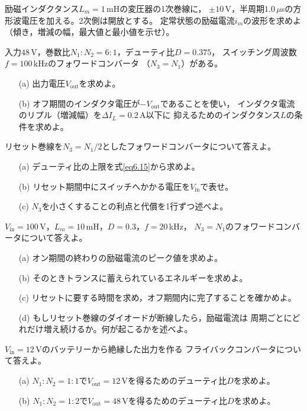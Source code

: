 \begin{章末問題}
\item \label{ex6.1}
励磁インダクタンス$L_m = 1$\,mHの変圧器の1次巻線に，
$\pm10$\,V，半周期$1.0$\,$\mu$sの方形波電圧を加える。2次側は開放とする。
定常状態の励磁電流$i_m$の波形を求めよ（傾き，増減の幅，最大値と最小値を示せ）。

\item \label{ex6.2}
入力$48$\,V，巻数比$N_1:N_2 = 6:1$，デューティ比$D = 0.375$，
スイッチング周波数$f = 100$\,kHzのフォワードコンバータ
（$N_3 = N_1$）がある。
\begin{enumerate}
\item[(a)] 出力電圧$V_{\mathrm{out}}$を求めよ。
\item[(b)] オフ期間のインダクタ電圧が$-V_{\mathrm{out}}$であることを使い，
インダクタ電流のリプル（増減幅）を$\mathit{\Delta}I_L = 0.2$\,A以下に
抑えるためのインダクタンス$L$の条件を求めよ。
\end{enumerate}

\item \label{ex6.3}
リセット巻線を$N_3 = N_1/2$としたフォワードコンバータについて答えよ。
\begin{enumerate}
\item[(a)] デューティ比の上限を式\ref{eq6.15}から求めよ。
\item[(b)] リセット期間中にスイッチへかかる電圧を$V_{\mathrm{in}}$で表せ。
\item[(c)] $N_3$を小さくすることの利点と代償を1行ずつ述べよ。
\end{enumerate}

\item \label{ex6.4}
$V_{\mathrm{in}} = 100$\,V，$L_m = 10$\,mH，$D = 0.3$，$f = 20$\,kHz，
$N_3 = N_1$のフォワードコンバータについて答えよ。
\begin{enumerate}
\item[(a)] オン期間の終わりの励磁電流のピーク値を求めよ。
\item[(b)] そのときトランスに蓄えられているエネルギーを求めよ。
\item[(c)] リセットに要する時間を求め，オフ期間内に完了することを確かめよ。
\item[(d)] もしリセット巻線のダイオードが断線したら，励磁電流は
周期ごとにどれだけ増え続けるか。何が起こるかを述べよ。
\end{enumerate}

\item \label{ex6.5}
$V_{\mathrm{in}} = 12$\,Vのバッテリーから絶縁した出力を作る
フライバックコンバータについて答えよ。
\begin{enumerate}
\item[(a)] $N_1:N_2 = 1:1$で$V_{\mathrm{out}} = 12$\,Vを得るためのデューティ比$D$を求めよ。
\item[(b)] $N_1:N_2 = 1:2$で$V_{\mathrm{out}} = 48$\,Vを得るためのデューティ比$D$を求めよ。
\end{enumerate}


\end{章末問題}
